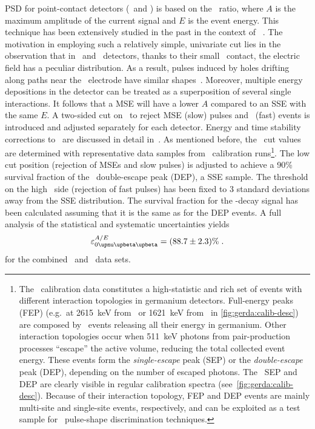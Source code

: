 PSD for point-contact detectors (\bege\ and \icoax) is based on the \aoe\ ratio, where $A$
is the maximum amplitude of the current signal and $E$ is the event energy. This technique
has been extensively studied in the past in the context of \gerda~\cite{Agostini2013,
Agostini2010, Budjas2008, Budjas2009, Budjas2009a, Agostini2010a}. The motivation in
employing such a relatively simple, univariate cut lies in the observation that in \bege\
and \icoax\ detectors, thanks to their small \pplus\ contact, the electric field has a
peculiar distribution. As a result, pulses induced by holes drifting along paths near the
\pplus\ electrode have similar shapes~\cite{Agostini2010}. Moreover, multiple energy
depositions in the detector can be treated as a superposition of several single
interactions. It follows that a MSE will have a lower $A$ compared to an SSE with the same
$E$. A two-sided cut on \aoe\ to reject MSE (slow) pulses and \pplus\ (fast) events is
introduced and adjusted separately for each detector. Energy and time stability
corrections to \aoe\ are discussed in detail in~\cite{Agostini2021a}. As mentioned before,
the \aoe\ cut values are determined with representative data samples from \Th\ calibration
runs\footnote{%
  The \Th\ calibration data constitutes a high-statistic and rich set of events with
  different interaction topologies in germanium detectors. Full-energy peaks (FEP)
  (e.g.~at 2615~keV from \Tl\ or 1621~keV from \Bil\ in \cref{fig:gerda:calib-desc}) are
  composed by \g\ events releasing all their energy in germanium. Other interaction
  topologies occur when 511~keV photons from pair-production processes ``escape'' the active
  volume, reducing the total collected event energy. These events form the
  \emph{single-escape} peak (SEP) or the \emph{double-escape} peak (DEP), depending on the
  number of escaped photons. The \Tl\ SEP and DEP are clearly visible in regular
  calibration spectra (see~\cref{fig:gerda:calib-desc}). Because of their interaction
  topology, FEP and DEP events are mainly multi-site and single-site events, respectively,
  and can be exploited as a test sample for \onbb\ pulse-shape discrimination techniques.
}. The low cut position (rejection of MSEs and slow pulses) is adjusted to achieve a 90\%
survival fraction of the \Tl\ double-escape peak (DEP), a SSE sample. The threshold on the
high \aoe\ side (rejection of fast pulses) has been fixed to 3 standard deviations away
from the SSE distribution. The survival fraction for the \onbb-decay signal has been
calculated assuming that it is the same as for the DEP events. A full analysis of the
statistical and systematic uncertainties yields
\[
  \epsilon_\onbbM^{A/E} = (88.7 \pm 2.3)\% \;.
\]
for the combined \bege\ and \icoax\ data sets.

